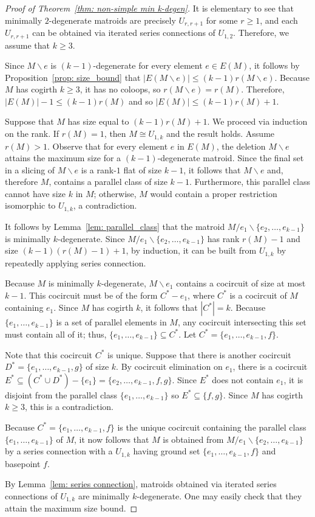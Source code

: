 \documentclass{amsart}
\newcommand{\ba}{\backslash}
\theoremstyle{definition}
\theoremstyle{remark}
\numberwithin{equation}{section}
\begin{document}
\begin{proof}[Proof of Theorem~\ref{thm: non-simple min k-degen}]
It is elementary to see that minimally $2$-degenerate matroids are precisely $U_{r,r+1}$ for some $r\geq 1$, and each $U_{r,r+1}$ can be obtained via iterated series connections of $U_{1,2}$. Therefore, we assume that $k\geq 3$.

Since $M \ba e$ is $(k-1)$-degenerate for every element $e \in E(M)$, it follows by Proposition~\ref{prop: size_bound} that $|E(M \ba e)| \leq (k-1)r(M \ba e)$. Because $M$ has cogirth $k \geq 3$, it has no coloops, so $r(M \ba e) = r(M)$. Therefore, $|E(M)| - 1 \leq (k-1)r(M)$ and so $|E(M)| \leq (k-1)r(M) + 1$. 

Suppose that $M$ has size equal to $(k-1)r(M)+1$. We proceed via induction on the rank. If $r(M) =1$, then $M \cong U_{1,k}$ and the result holds. Assume $r(M) > 1$. Observe that for every element $e$ in $E(M)$, the deletion $M \ba e$ attains the maximum size for a $(k-1)$-degenerate matroid. Since the final set in a slicing of $M \ba e$ is a rank-$1$ flat of size $k-1$, it follows that $M \ba e$ and, therefore $M$, contains a parallel class of size $k-1$. Furthermore, this parallel class cannot have size $k$ in $M$; otherwise, $M$ would contain a proper restriction isomorphic to $U_{1,k}$, a contradiction.

It follows by Lemma~\ref{lem: parallel_class} that the matroid $M/e_1 \ba \{e_2, \ldots, e_{k-1}\}$ is minimally $k$-degenerate. Since $M/e_1 \ba \{e_2, \ldots, e_{k-1}\}$ has rank $r(M)-1$ and size $(k-1)(r(M)-1) + 1$, by induction, it can be built from $U_{1,k}$ by repeatedly applying series connection. 

Because $M$ is minimally $k$-degenerate, $M \ba e_1$ contains a cocircuit of size at most $k-1$. This cocircuit must be of the form $C^* - e_1$, where $C^*$ is a cocircuit of $M$ containing $e_1$. Since $M$ has cogirth $k$, it follows that $|C^*| = k$. Because $\{e_1, \ldots, e_{k-1}\}$ is a set of parallel elements in $M$, any cocircuit intersecting this set must contain all of it; thus, $\{e_1, \ldots, e_{k-1}\} \subseteq C^*$. Let $C^* = \{e_1, \ldots, e_{k-1}, f\}$. 

Note that this cocircuit $C^*$ is unique. Suppose that there is another cocircuit $D^* = \{e_1, \ldots, e_{k-1}, g\}$ of size $k$. By cocircuit elimination on $e_1$, there is a cocircuit $E^* \subseteq (C^* \cup D^*) - \{e_1\} = \{e_2, \ldots, e_{k-1}, f, g\}$. Since $E^*$ does not contain $e_1$, it is disjoint from the parallel class $\{e_1, \ldots, e_{k-1}\}$ so $E^* \subseteq \{f, g\}$. Since $M$ has cogirth $k \geq 3$, this is a contradiction.

Because $C^* = \{e_1, \ldots, e_{k-1}, f\}$ is the unique cocircuit containing the parallel class $\{e_1, \ldots, e_{k-1}\}$ of $M$, it now follows that $M$ is obtained from $M/e_1 \ba \{e_2, \ldots, e_{k-1}\}$ by a series connection with a $U_{1,k}$ having ground set $\{e_1, \ldots, e_{k-1}, f\}$ and basepoint $f$.

By Lemma~\ref{lem: series connection}, matroids obtained via iterated series connections of $U_{1,k}$ are minimally $k$-degenerate. One may easily check that they attain the maximum size bound.
\end{proof}
\end{document}
